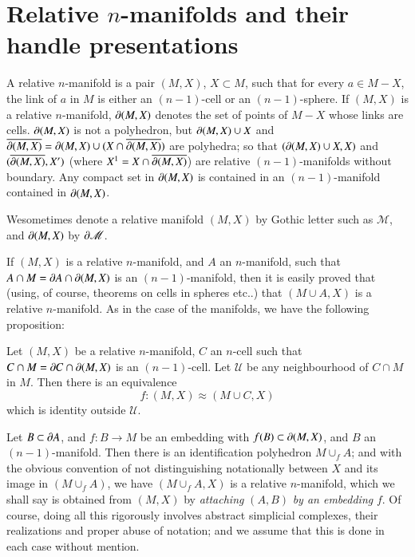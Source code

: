\section{Relative $n$-manifolds and their handle presentations}\label{chap8-sec8.2}

A relative $n$-manifold is a pair $(M,X)$, $X\subset M$, such that for every $a\in M-X$, the link of $a$ in $M$ is either an $(n-1)$-cell or an $(n-1)$-sphere. If $(M,X)$ is a relative $n$-manifold, $\partial (M,X)$ denotes the set of points of $M-X$ whose links are cells. $\partial(M,X)$ is not a polyhedron, but $\partial (M,X)\cup X$ and $\overline{\partial(M,X)}=\partial(M,X)\cup (X\cap \overline{\partial(M,X)})$ are polyhedra; so that $(\partial (M,X)\cup X,X)$ and $(\overline{\partial (M,X)},X')$ (where $X^{1}=X\cap \overline{\partial(M,X)}$) are relative $(n-1)$-manifolds without boundary. Any compact set in $\partial(M,X)$ is contained in an $(n-1)$-manifold contained in $\partial(M,X)$.

We\pageoriginale sometimes denote a relative manifold $(M,X)$ by Gothic letter such as $\mathscr{M}$, and $\partial (M,X)$ by $\partial\mathscr{M}$.

If $(M,X)$ is a relative $n$-manifold, and $A$ an $n$-manifold, such that $A\cap M=\partial A\cap \partial (M,X)$ is an $(n-1)$-manifold, then it is easily proved that (using, of course, theorems on cells in spheres etc..) that $(M\cup A,X)$ is a relative $n$-manifold. As in the case of the manifolds, we have the following proposition:

\begin{proposition}\label{chap8-prop8.2.1}
Let $(M,X)$ be a relative $n$-manifold, $C$ an $n$-cell such that $C\cap M=\partial C\cap \partial (M,X)$ is an $(n-1)$-cell. Let $\mathscr{U}$ be any neighbourhood of $C\cap M$ in $M$. Then there is an equivalence
$$
f:(M,X)\approx (M\cup C,X)
$$
which is identity outside $\mathscr{U}$.
\end{proposition}

Let $B\subset \partial A$, and $f:B\to M$ be an embedding with $f(B)\subset \partial (M,X)$, and $B$ an $(n-1)$-manifold. Then there is an identification polyhedron $M\cup_{f}A$; and with the obvious convention of not distinguishing notationally between $X$ and its image in $(M\cup_{f}A)$, we have $(M\cup_{f}A,X)$ is a relative $n$-manifold, which we shall say is obtained from $(M,X)$ by {\em attaching} $(A,B)$ {\em by an embedding} $f$. Of course, doing all this rigorously involves abstract simplicial complexes, their realizations and proper abuse of notation; and we assume that this is done in each case without mention.

